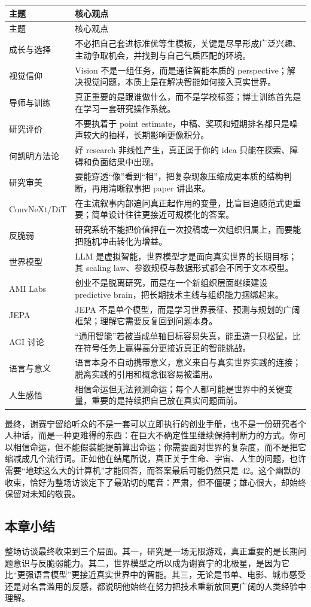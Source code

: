 \begin{longtable}{>{\raggedright\arraybackslash}p{} >{\raggedright\arraybackslash}p{}}
\toprule
主题 & 核心观点 \\
\midrule
\endfirsthead
\toprule
主题 & 核心观点 \\
\midrule
\endhead
成长与选择 & 不必把自己套进标准优等生模板，关键是尽早形成广泛兴趣、主动争取机会，并找到与自己气质匹配的环境。 \\
视觉信仰 & Vision 不是一组任务，而是通往智能本质的 perspective；解决视觉问题，本质上是在解决智能如何接入真实世界。 \\
导师与训练 & 真正重要的是跟谁做什么，而不是学校标签；博士训练首先是在学习一套研究操作系统。 \\
研究评价 & 不要执着于 point estimate，中稿、奖项和短期排名都只是噪声较大的抽样，长期影响更像积分。 \\
何凯明方法论 & 好 research 非线性产生，真正属于你的 idea 只能在探索、障碍和负面结果中出现。 \\
研究审美 & 要能穿透“像”看到“相”，把复杂现象压缩成更本质的结构判断，再用清晰叙事把 paper 讲出来。 \\
ConvNeXt/DiT & 在主流叙事内部追问真正起作用的变量，比盲目追随范式更重要；简单设计往往更接近可规模化的答案。 \\
反脆弱 & 研究系统不能把价值押在一次投稿或一次组织归属上，而要能把随机冲击转化为增益。 \\
世界模型 & LLM 是虚拟智能，世界模型才是面向真实世界的长期目标；其 scaling law、参数规模与数据形式都会不同于文本模型。 \\
AMI Labs & 创业不是脱离研究，而是在一个新组织层面继续建设 predictive brain，把长期技术主线与组织能力捆绑起来。 \\
JEPA & JEPA 不是单个模型，而是学习世界表征、预测与规划的广阔框架；理解它需要反复回到问题本身。 \\
AGI 讨论 & “通用智能”若被当成单轴目标容易失真，能重造一只松鼠，比在符号任务上赢得高分更接近真正的智能挑战。 \\
语言与意义 & 语言本身不自动携带意义，意义来自与真实世界实践的连接；脱离实践的引用和概念很容易被滥用。 \\
人生感悟 & 相信命运但无法预测命运；每个人都可能是世界中的关键变量，重要的是持续把自己放在真实问题面前。 \\
\bottomrule
\end{longtable}

最终，谢赛宁留给听众的不是一套可以立即执行的创业手册，也不是一份研究者个人神话，而是一种更难得的东西：在巨大不确定性里继续保持判断力的方式。你可以相信命运，但不能假装能提前算出命运；你需要面对世界的复杂度，而不是把它缩减成几个流行词。正如他在结尾所说，真正关于生命、宇宙、人生的问题，也许需要“地球这么大的计算机”才能回答，而答案最后可能仍然只是 42。这个幽默的收束，恰好为整场访谈定下了最贴切的尾音：严肃，但不僵硬；雄心很大，却始终保留对未知的敬畏。

\subsection{本章小结}

整场访谈最终收束到三个层面。其一，研究是一场无限游戏，真正重要的是长期问题意识与反脆弱能力。其二，世界模型之所以成为谢赛宁的北极星，是因为它比“更强语言模型”更接近真实世界中的智能。其三，无论是书单、电影、城市感受还是对名言滥用的反感，都说明他始终在努力把技术重新放回更广阔的人类经验中理解。

